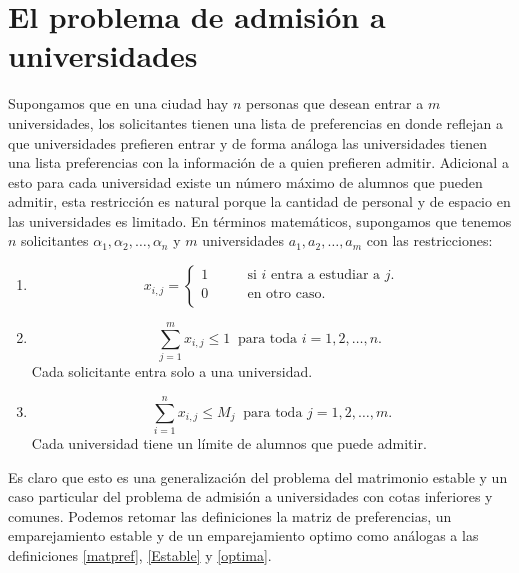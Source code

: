 \chapter{El problema de admisión a universidades}
Supongamos que en una ciudad hay $n$ personas que desean entrar a $m$ universidades, los solicitantes tienen una lista de preferencias en donde reflejan a que universidades prefieren entrar y de forma análoga las universidades tienen una lista preferencias con la información de a quien prefieren admitir. Adicional a esto para cada universidad existe un número máximo de alumnos que pueden admitir, esta restricción es natural porque la cantidad de personal y de espacio en las universidades es limitado. 
En términos matemáticos, supongamos que tenemos $n$ solicitantes $\alpha_1,\alpha_2,\ldots,\alpha_n$ y $m$ universidades $a_1, a_2,\ldots,a_m$ con las restricciones:
\begin{enumerate}
\item \begin{equation} \label{2r1}
x_{i,j}= 
\begin{cases}
1 & \qquad \text{si $i$ entra a estudiar a $j$.} \\
0 &\qquad\text{en otro caso.}\ \\ 
\end{cases} \end{equation}
\item \begin{equation} \label{2r2}
\sum_{j=1}^{m}x_{i,j} \leq1 \ \text{ para toda $i=1,2,\ldots,n$. }
\end{equation} Cada solicitante entra solo a una universidad. 
\item \begin{equation} \label{2r3}
\sum_{i=1}^{n} x_{i,j} \leq M_j\ \text{ para toda $j=1,2,\dots,m$.} 
\end{equation}
Cada universidad tiene un límite de alumnos que puede admitir. 

\end{enumerate}

Es claro que esto es una generalización del problema del matrimonio estable y un caso particular del problema de admisión a universidades con cotas inferiores y comunes. Podemos retomar las definiciones la matriz de preferencias, un emparejamiento estable y de un emparejamiento optimo como análogas a las definiciones \ref{matpref}, \ref{Estable} y \ref{optima}.

